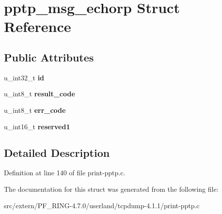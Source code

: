 \hypertarget{structpptp__msg__echorp}{
\section{pptp\_\-msg\_\-echorp Struct Reference}
\label{structpptp__msg__echorp}
}
\subsection*{Public Attributes}
\begin{DoxyCompactItemize}
\item 
\hypertarget{structpptp__msg__echorp_a4fb147c2e3a734b90bcd5307878afa36}{
u\_\-int32\_\-t {\bfseries id}}
\label{structpptp__msg__echorp_a4fb147c2e3a734b90bcd5307878afa36}

\item 
\hypertarget{structpptp__msg__echorp_a836a2c970338d7205ae410710f78dfce}{
u\_\-int8\_\-t {\bfseries result\_\-code}}
\label{structpptp__msg__echorp_a836a2c970338d7205ae410710f78dfce}

\item 
\hypertarget{structpptp__msg__echorp_ad300b19cce853dfd69ce701cd774268d}{
u\_\-int8\_\-t {\bfseries err\_\-code}}
\label{structpptp__msg__echorp_ad300b19cce853dfd69ce701cd774268d}

\item 
\hypertarget{structpptp__msg__echorp_a1c19798cef1bcf53aa0649d958ee3508}{
u\_\-int16\_\-t {\bfseries reserved1}}
\label{structpptp__msg__echorp_a1c19798cef1bcf53aa0649d958ee3508}

\end{DoxyCompactItemize}


\subsection{Detailed Description}


Definition at line 140 of file print-\/pptp.c.



The documentation for this struct was generated from the following file:\begin{DoxyCompactItemize}
\item 
src/extern/PF\_\-RING-\/4.7.0/userland/tcpdump-\/4.1.1/print-\/pptp.c\end{DoxyCompactItemize}
